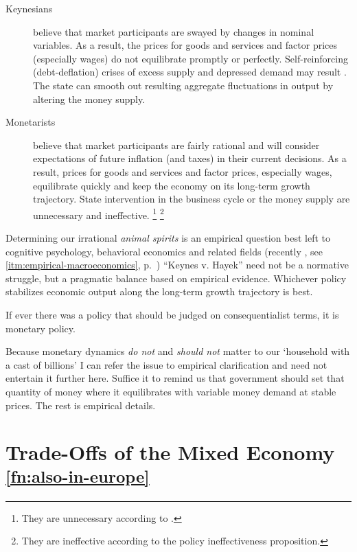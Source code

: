 \begin{enumerate}
	\begin{description}
		\item[Keynesians] believe that market participants are swayed by changes in nominal variables.
		As a result, the prices for goods and services and factor prices (especially wages) do not equilibrate promptly or perfectly.
		Self-reinforcing (debt-deflation) crises of excess supply and depressed demand may result \citep{Fisher1933}.
		The state can smooth out resulting aggregate fluctuations in output by altering the money supply.
		\item[Monetarists] believe that market participants are fairly rational and will consider expectations of future inflation (and taxes) in their current decisions.
		As a result, prices for goods and services and factor prices, especially wages, equilibrate quickly and keep the economy on its long-term growth trajectory.
		State intervention in the business cycle or the money supply are unnecessary and ineffective.
		\footnote{
			They are unnecessary according to .
		}
		\footnote{
			They are ineffective according to the policy ineffectiveness proposition.
		}
	\end{description}

	Determining our irrational \emph{animal spirits} \citep{Keynes1936} is an empirical question best left to cognitive psychology, behavioral economics and related fields (recently \citealt{Akerlof2010}, see \autoref{itm:empirical-macroeconomics}, p.~\pageref{itm:empirical-macroeconomics})
	``Keynes v.
Hayek'' \citep{Wapshott2011} need not be a normative struggle, but a pragmatic balance based on empirical evidence.
	Whichever policy stabilizes economic output along the long-term growth trajectory is best.

	If ever there was a policy that should be judged on consequentialist terms, it is monetary policy.
\end{enumerate}

Because monetary dynamics \emph{do not} and \emph{should not} matter to our `household with a cast of billions' I can refer the issue to empirical clarification and need not entertain it further here.
Suffice it to remind us that government should set that quantity of money where it equilibrates with variable money demand at stable prices.
The rest is empirical details.

\section[Trade-Offs]{Trade-Offs of the Mixed Economy \textsuperscript{\ref{fn:also-in-europe}}} \label{sec:trade-offs}


